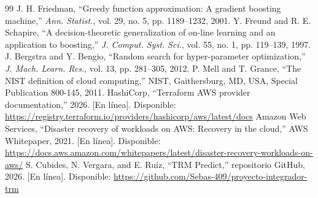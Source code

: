 \documentclass[conference]{IEEEtran}
\begin{document}
\begin{thebibliography}{99}
 J. H. Friedman, ``Greedy function approximation: A gradient boosting machine,'' \emph{Ann. Statist.}, vol. 29, no. 5, pp. 1189--1232, 2001.
 Y. Freund and R. E. Schapire, ``A decision-theoretic generalization of on-line learning and an application to boosting,'' \emph{J. Comput. Syst. Sci.}, vol. 55, no. 1, pp. 119--139, 1997.
 J. Bergstra and Y. Bengio, ``Random search for hyper-parameter optimization,'' \emph{J. Mach. Learn. Res.}, vol. 13, pp. 281--305, 2012.
 P. Mell and T. Grance, ``The NIST definition of cloud computing,'' NIST, Gaithersburg, MD, USA, Special Publication 800-145, 2011.
 HashiCorp, ``Terraform AWS provider documentation,'' 2026. [En línea]. Disponible: \url{https://registry.terraform.io/providers/hashicorp/aws/latest/docs}
 Amazon Web Services, ``Disaster recovery of workloads on AWS: Recovery in the cloud,'' AWS Whitepaper, 2021. [En línea]. Disponible: \url{https://docs.aws.amazon.com/whitepapers/latest/disaster-recovery-workloads-on-aws/}
 S. Cubides, N. Vergara, and E. Ruiz, ``TRM Predict,'' repositorio GitHub, 2026. [En línea]. Disponible: \url{https://github.com/Sebas-409/proyecto-integrador-trm}
\end{thebibliography}
\end{document}
